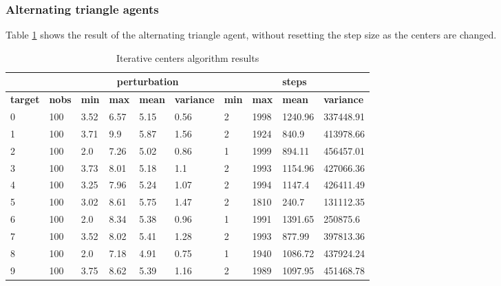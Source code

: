\documentclass{article}
\begin{document}
\subsubsection{Alternating triangle agents}
Table \ref{tab:iterative_result} shows the result of the alternating triangle agent, without resetting the step size as the centers are changed.

\begin{table}[h]
\caption{Iterative centers algorithm results}
\label{tab:iterative_result}
\begin{tabular}{|l|l|l|l|l|l|l|l|l|l|}
\hline
\textbf{}       & \textbf{}     & \multicolumn{4}{c|}{\textbf{perturbation}}                      & \multicolumn{4}{c|}{\textbf{steps}}                             \\ \hline
\textbf{target} & \textbf{nobs} & \textbf{min} & \textbf{max} & \textbf{mean} & \textbf{variance} & \textbf{min} & \textbf{max} & \textbf{mean} & \textbf{variance} \\ \hline
0 & 100  & 3.52     & 6.57     & 5.15      & 0.56          & 2         & 1998      & 1240.96    & 337448.91      \\ \hline
1 & 100  & 3.71     & 9.9      & 5.87      & 1.56          & 2         & 1924      & 840.9      & 413978.66      \\ \hline
2 & 100  & 2.0      & 7.26     & 5.02      & 0.86          & 1         & 1999      & 894.11     & 456457.01      \\ \hline
3 & 100  & 3.73     & 8.01     & 5.18      & 1.1           & 2         & 1993      & 1154.96    & 427066.36      \\ \hline
4 & 100  & 3.25     & 7.96     & 5.24      & 1.07          & 2         & 1994      & 1147.4     & 426411.49      \\ \hline
5 & 100  & 3.02     & 8.61     & 5.75      & 1.47          & 2         & 1810      & 240.7      & 131112.35      \\ \hline
6 & 100  & 2.0      & 8.34     & 5.38      & 0.96          & 1         & 1991      & 1391.65    & 250875.6       \\ \hline
7 & 100  & 3.52     & 8.02     & 5.41      & 1.28          & 2         & 1993      & 877.99     & 397813.36      \\ \hline
8 & 100  & 2.0      & 7.18     & 4.91      & 0.75          & 1         & 1940      & 1086.72    & 437924.24      \\ \hline
9 & 100  & 3.75     & 8.62     & 5.39      & 1.16          & 2         & 1989      & 1097.95    & 451468.78      \\ \hline
\end{tabular}
\end{table}
\end{document}
